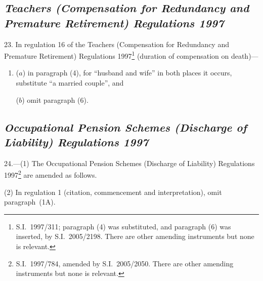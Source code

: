 \documentclass[12pt,a4paper]{article}
\begin{document}
\subsection*{\itshape Teachers (Compensation for Redundancy and Premature Retirement) Regulations 1997}

23.  In regulation 16 of the Teachers (Compensation for Redundancy and Premature Retirement) Regulations 1997\footnote{S.I.~1997/311; paragraph (4) was substituted, and paragraph (6) was inserted, by S.I.~2005/2198. There are other amending instruments but none is relevant.} (duration of compensation on death)—
\begin{enumerate}\item[]
($a$) in paragraph (4), for “husband and wife” in both places it occurs, substitute “a married couple”, and

($b$) omit paragraph (6).
\end{enumerate}

\subsection*{\itshape Occupational Pension Schemes (Discharge of Liability) Regulations 1997}

24.—(1) The Occupational Pension Schemes (Discharge of Liability) Regulations 1997\footnote{S.I.~1997/784, amended by S.I.~2005/2050. There are other amending instruments but none is relevant.} are amended as follows.

(2) In regulation 1 (citation, commencement and interpretation), omit paragraph~(1A).
\end{document}
